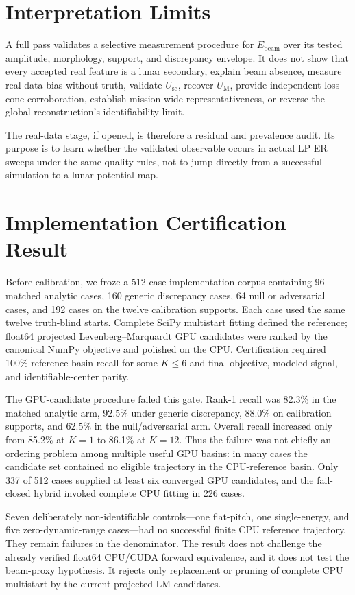 \documentclass[11pt]{article}
\newcommand{\UM}{U_{\mathrm{M}}}
\newcommand{\Usc}{U_{\mathrm{sc}}}
\newcommand{\Ebeam}{E_{\mathrm{beam}}}
\begin{document}
\section{Interpretation Limits}

A full pass validates a selective measurement procedure for $\Ebeam$ over its
tested amplitude, morphology, support, and discrepancy envelope.  It does not
show that every accepted real feature is a lunar secondary, explain beam
absence, measure real-data bias without truth, validate $\Usc$, recover $\UM$,
provide independent loss-cone corroboration, establish mission-wide
representativeness, or reverse the global reconstruction's identifiability
limit.

The real-data stage, if opened, is therefore a residual and prevalence audit.
Its purpose is to learn whether the validated observable occurs in actual LP ER
sweeps under the same quality rules, not to jump directly from a successful
simulation to a lunar potential map.

\section{Implementation Certification Result}

Before calibration, we froze a 512-case implementation corpus containing 96
matched analytic cases, 160 generic discrepancy cases, 64 null or adversarial
cases, and 192 cases on the twelve calibration supports.  Each case used the
same twelve truth-blind starts.  Complete SciPy multistart fitting defined the
reference; float64 projected Levenberg--Marquardt GPU candidates were ranked by
the canonical NumPy objective and polished on the CPU.  Certification required
100\% reference-basin recall for some $K\leq6$ and final objective, modeled
signal, and identifiable-center parity.

The GPU-candidate procedure failed this gate.  Rank-1 recall was 82.3\% in the
matched analytic arm, 92.5\% under generic discrepancy, 88.0\% on calibration
supports, and 62.5\% in the null/adversarial arm.  Overall recall increased
only from 85.2\% at $K=1$ to 86.1\% at $K=12$.  Thus the failure was not chiefly
an ordering problem among multiple useful GPU basins: in many cases the
candidate set contained no eligible trajectory in the CPU-reference basin.
Only 337 of 512 cases supplied at least six converged GPU candidates, and the
fail-closed hybrid invoked complete CPU fitting in 226 cases.

Seven deliberately non-identifiable controls---one flat-pitch, one
single-energy, and five zero-dynamic-range cases---had no successful finite CPU
reference trajectory.  They remain failures in the denominator.  The result
does not challenge the already verified float64 CPU/CUDA forward equivalence,
and it does not test the beam-proxy hypothesis.  It rejects only replacement or
pruning of complete CPU multistart by the current projected-LM candidates.
\end{document}
